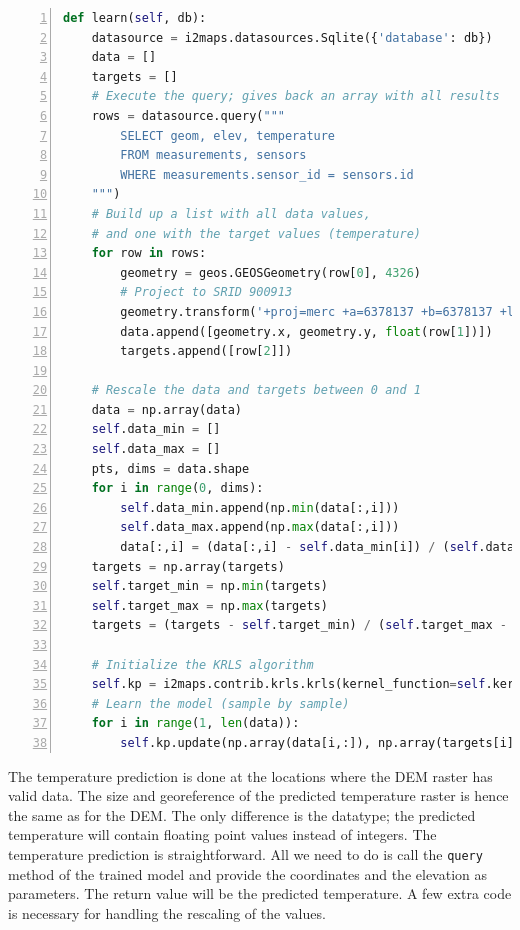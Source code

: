 \documentclass[11pt]{article}
\begin{document}
\begin{lstlisting}[language=Python, numbers=left, numberstyle=\footnotesize, numbersep=5pt]
def learn(self, db):
    datasource = i2maps.datasources.Sqlite({'database': db})
    data = []
    targets = []
    # Execute the query; gives back an array with all results
    rows = datasource.query("""
        SELECT geom, elev, temperature
        FROM measurements, sensors
        WHERE measurements.sensor_id = sensors.id
    """)
    # Build up a list with all data values, 
    # and one with the target values (temperature)
    for row in rows:
        geometry = geos.GEOSGeometry(row[0], 4326)
        # Project to SRID 900913
        geometry.transform('+proj=merc +a=6378137 +b=6378137 +lat_ts=0.0 +lon_0=0.0 +x_0=0.0 +y_0=0 +k=1.0 +units=m +nadgrids=@null +no_defs')
        data.append([geometry.x, geometry.y, float(row[1])])
        targets.append([row[2]])
        
    # Rescale the data and targets between 0 and 1
    data = np.array(data)
    self.data_min = []
    self.data_max = []
    pts, dims = data.shape
    for i in range(0, dims):
        self.data_min.append(np.min(data[:,i]))
        self.data_max.append(np.max(data[:,i]))
        data[:,i] = (data[:,i] - self.data_min[i]) / (self.data_max[i] - self.data_min[i])
    targets = np.array(targets)
    self.target_min = np.min(targets)
    self.target_max = np.max(targets)
    targets = (targets - self.target_min) / (self.target_max - self.target_min)
    
    # Initialize the KRLS algorithm
    self.kp = i2maps.contrib.krls.krls(kernel_function=self.kernel, adopt_thresh=self.ald_thresh, state=data[0,:], target=targets[0], maxsize=self.maxsize, adaptive=self.adaptive, forget_rate=self.forget_rate)
    # Learn the model (sample by sample)
    for i in range(1, len(data)):
        self.kp.update(np.array(data[i,:]), np.array(targets[i]))
\end{lstlisting}

The temperature prediction is done at the locations where the DEM raster has valid data. The size and georeference of the predicted temperature raster is hence the same as for the DEM. The only difference is the datatype; the predicted temperature will contain floating point values instead of integers. The temperature prediction is straightforward. All we need to do is call the \texttt{query} method of the trained model and provide the coordinates and the elevation as parameters. The return value will be the predicted temperature. A few extra code is necessary for handling the rescaling of the values.
\end{document}
